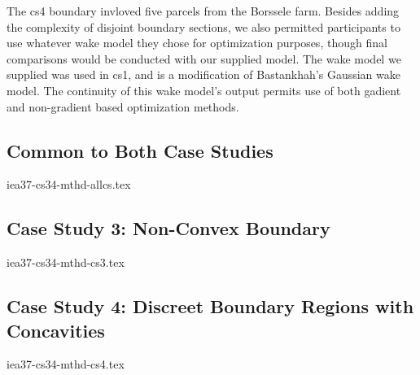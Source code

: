 The cs4 boundary invloved five parcels from the Borssele farm.
Besides adding the complexity of disjoint boundary sections, we also permitted participants to use whatever wake model they chose for optimization purposes, though final comparisons would be conducted with our supplied model.
The wake model we supplied was used in cs1, and is a modification of Bastankhah's Gaussian wake model.
The continuity of this wake model's output permits use of both gadient and non-gradient based optimization methods.

\bigskip
\subsection{Common to Both Case Studies} \label{sec:windfarm}

	{iea37-cs34-mthd-allcs.tex}
	
\subsection{Case Study 3: Non-Convex Boundary} \label{sec:cs3}

	{iea37-cs34-mthd-cs3.tex}

\subsection{Case Study 4: Discreet Boundary Regions with Concavities} \label{sec:cs4}

	{iea37-cs34-mthd-cs4.tex}
